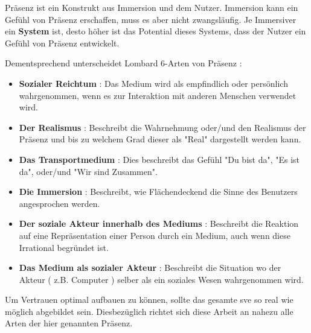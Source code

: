 \documentclass[a4paper,11pt]{article}%
\renewcommand{\\}{\vspace*{0.5\baselineskip} \newline}
\begin{document}
Präsenz ist ein Konstrukt aus Immersion und dem Nutzer. Immersion kann ein Gefühl von Präsenz erschaffen, muss es aber nicht zwangsläufig. Je Immersiver ein \textbf{System} ist, desto höher ist das Potential dieses Systems, dass der Nutzer ein Gefühl von Präsenz entwickelt.
			
Dementsprechend unterscheidet Lombard 6-Arten von Präsenz :
	\begin{itemize}
		\item \textbf{Sozialer Reichtum} : Das Medium wird als empfindlich oder persönlich wahrgenommen, wenn es zur Interaktion mit anderen Menschen verwendet wird.
		\item \textbf{Der Realismus} : Beschreibt die Wahrnehmung oder/und den Realismus der Präsenz und bis zu welchem Grad dieser als "Real" dargestellt werden kann.
		\item \textbf{Das Transportmedium} : Dies beschreibt das Gefühl "Du bist da", "Es ist da", oder/und "Wir sind Zusammen".
		\item \textbf{Die Immersion} : Beschreibt, wie Flächendeckend die Sinne des Benutzers angesprochen werden.
		\item \textbf{Der soziale Akteur innerhalb des Mediums} : Beschreibt die Reaktion auf eine Repräsentation einer Person durch ein Medium, auch wenn diese Irrational begründet ist.
		\item \textbf{Das Medium als sozialer Akteur} : Beschreibt die Situation wo der Akteur ( z.B. Computer ) selber als ein soziales Wesen wahrgenommen wird.					
				\citep{lombard1997heart}
			\end{itemize}
			
Um Vertrauen optimal aufbauen zu können, sollte das gesamte \ac{sve} so real wie möglich abgebildet sein. Diesbezüglich richtet sich diese Arbeit an nahezu alle Arten der hier genannten Präsenz.

\end{document}

